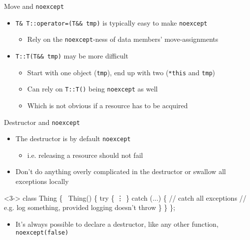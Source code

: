 \begin{frame}{Move and \texttt{noexcept}}
  \begin{itemize}
  \item<1-> \texttt{T\& T::operator=(T\&\& tmp)} is typically easy to make
    \texttt{noexcept}
    \begin{itemize}
    \item<2-> Rely on the \texttt{noexcept}-ness of data members' move-assignments
    \end{itemize}
  \item<3-> \texttt{T::T(T\&\& tmp)} may be more difficult
    \begin{itemize}
    \item<3-> Start with one object (\texttt{tmp}), end up with two (\texttt{*this}
      and \texttt{tmp})
    \item<4-> Can rely on \texttt{T::T()} being \texttt{noexcept} as well
    \item<4-> Which is not obvious if a resource has to be acquired
    \end{itemize}
  \end{itemize}
\end{frame}

\begin{frame}[fragile]{Destructor and \texttt{noexcept}}

  \begin{itemize}
  \item The destructor is by default \texttt{noexcept}
    \begin{itemize}
    \item i.e. releasing a resource should not fail
    \end{itemize}
  \item<2-> Don't do anything overly complicated in the destructor or swallow all
    exceptions locally
  \end{itemize}

  \begin{codeblock}<3->
class Thing \{
  ~Thing()
  \{
    try \{
      \vdots
    \} catch (\alert{...}) \{ // catch \alert{all} exceptions
      // e.g. log something, provided logging doesn't throw
    \}
  \}
\};\end{codeblock}

  \begin{itemize}
  \item<4-> It's always possible to declare a destructor, like any other function,
    \texttt{noexcept(false)}
  \end{itemize}

\end{frame}
